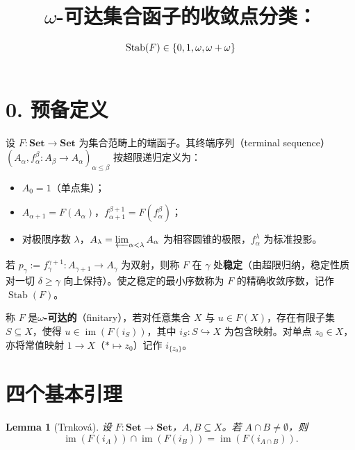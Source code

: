 \documentclass[11pt,a4paper]{ctexart}
\title{$\omega$-可达集合函子的收敛点分类：$\Stab(F) \in \{0, 1, \omega, \omega + \omega\}$}
\date{}
\theoremstyle{plain}
\newtheorem{lemma}{Lemma}[section]
\newcommand{\Stab}{\operatorname{Stab}}
\newcommand{\im}{\operatorname{im}}
\newcommand{\Set}{\mathbf{Set}}
\begin{document}
\maketitle

\section*{0. 预备定义}

设 $F : \Set \to \Set$ 为集合范畴上的端函子。其终端序列（terminal sequence）$(A_\alpha, f_\alpha^\beta : A_\beta \to A_\alpha)_{\alpha \le \beta}$ 按超限递归定义为：
\begin{itemize}[leftmargin=2em]
  \item $A_0 = 1$（单点集）；
  \item $A_{\alpha+1} = F(A_\alpha)$，$f_{\alpha+1}^{\beta+1} = F(f_\alpha^\beta)$；
  \item 对极限序数 $\lambda$，$A_\lambda = \varprojlim_{\alpha < \lambda} A_\alpha$ 为相容圆锥的极限，$f_\alpha^\lambda$ 为标准投影。
\end{itemize}
若 $p_\gamma := f_\gamma^{\gamma+1} : A_{\gamma+1} \to A_\gamma$ 为双射，则称 $F$ 在 $\gamma$ 处\textbf{稳定}（由超限归纳，稳定性质对一切 $\delta \ge \gamma$ 向上保持）。使之稳定的最小序数称为 $F$ 的精确收敛序数，记作 $\Stab(F)$。

称 $F$ 是\textbf{$\omega$-可达的}（finitary），若对任意集合 $X$ 与 $u \in F(X)$，存在有限子集 $S \subseteq X$，使得 $u \in \im(F(i_S))$，其中 $i_S : S \hookrightarrow X$ 为包含映射。对单点 $z_0 \in X$，亦将常值映射 $1 \to X$（$* \mapsto z_0$）记作 $i_{\{z_0\}}$。

\section{四个基本引理}

\begin{lemma}[Trnková]
设 $F : \Set \to \Set$，$A, B \subseteq X$。若 $A \cap B \neq \emptyset$，则
\[
  \im(F(i_A)) \cap \im(F(i_B)) = \im(F(i_{A \cap B})).
\]
\end{lemma}
\end{document}
